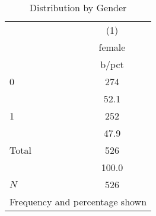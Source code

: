 \begin{table}[htbp]\centering
\def\sym#1{\ifmmode^{#1}\else\(^{#1}\)\fi}
\caption{Distribution by Gender}
\begin{tabular}{l*{1}{c}}
\toprule
            &\multicolumn{1}{c}{(1)}\\
            &\multicolumn{1}{c}{female}\\
            &       b/pct\\
\midrule
0           &         274\\
            &        52.1\\
1           &         252\\
            &        47.9\\
Total       &         526\\
            &       100.0\\
\midrule
\(N\)       &         526\\
\bottomrule
\multicolumn{2}{l}{\footnotesize Frequency and percentage shown}\\
\end{tabular}
\end{table}
